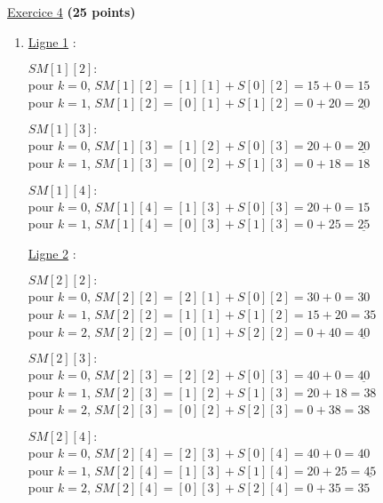 \documentclass[11pt]{article}
\begin{document}
\newpage

\underline{Exercice 4} \textbf{(25 points)}

\begin{enumerate}[label=\Roman*.]

\item 
\underline{Ligne 1} :
\smallskip

$SM[1][2]:$\\
pour $k=0$, $SM[1][2]= [1][1] + S[0][2] = 15+0 = 15$ \\
pour $k=1$, $SM[1][2]= [0][1] + S[1][2] = 0+ 20 = \underline{20}$ \\
\smallskip

$SM[1][3]:$\\
pour $k=0$, $SM[1][3]= [1][2] + S[0][3] = 20 +0 = \underline{20}$ \\
pour $k=1$, $SM[1][3]= [0][2] + S[1][3] = 0+ 18 = 18$ \\
\smallskip

$SM[1][4]:$\\
pour $k=0$, $SM[1][4]= [1][3] + S[0][3] = 20+0 = 15$ \\
pour $k=1$, $SM[1][4]= [0][3] + S[1][3] = 0+ 25 = \underline{25}$ \\
\smallskip

 \underline{Ligne 2} : 
 
 \smallskip

 $SM[2][2]:$\\
pour $k=0$, $SM[2][2]= [2][1] + S[0][2] = 30+0 = 30$ \\
pour $k=1$, $SM[2][2]= [1][1] + S[1][2] = 15+ 20 = 35$ \\
pour $k=2$, $SM[2][2]= [0][1] + S[2][2] = 0+ 40 = \underline{40}$ \\
\smallskip

$SM[2][3]:$\\
pour $k=0$, $SM[2][3]= [2][2] + S[0][3] = 40 +0 = \underline{40}$ \\
pour $k=1$, $SM[2][3]= [1][2] + S[1][3] = 20+ 18 = 38$ \\
pour $k=2$, $SM[2][3]= [0][2] + S[2][3] = 0+ 38 = 38$ \\
\smallskip

$SM[2][4]:$\\
pour $k=0$, $SM[2][4]= [2][3] + S[0][4] = 40+0 = 40$ \\
pour $k=1$, $SM[2][4]= [1][3] + S[1][4] = 20+ 25 = \underline{45}$ \\
pour $k=2$, $SM[2][4]= [0][3] + S[2][4] = 0+ 35 = 35$ \\
\smallskip


\end{enumerate}
\end{document}
